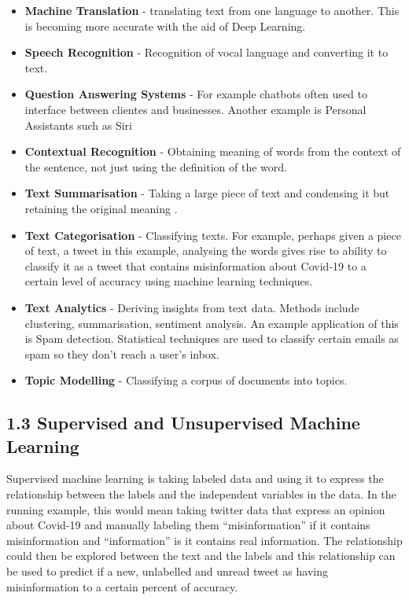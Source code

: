 \documentclass[
]{article}
\providecommand{\tightlist}{%
  \setlength{\itemsep}{0pt}\setlength{\parskip}{0pt}}
\begin{document}
\begin{itemize}
\tightlist
\item
  \textbf{Machine Translation} - translating text from one language to
  another. This is becoming more accurate with the aid of Deep Learning.
\item
  \textbf{Speech Recognition} - Recognition of vocal language and
  converting it to text.
\item
  \textbf{Question Answering Systems} - For example chatbots often used
  to interface between clientes and businesses. Another example is
  Personal Assistants such as Siri
\item
  \textbf{Contextual Recognition} - Obtaining meaning of words from the
  context of the sentence, not just using the definition of the word.
\item
  \textbf{Text Summarisation} - Taking a large piece of text and
  condensing it but retaining the original meaning .
\item
  \textbf{Text Categorisation} - Classifying texts. For example, perhaps
  given a piece of text, a tweet in this example, analysing the words
  gives rise to ability to classify it as a tweet that contains
  misinformation about Covid-19 to a certain level of accuracy using
  machine learning techniques.
\item
  \textbf{Text Analytics} - Deriving insights from text data. Methods
  include clustering, summarisation, sentiment analysis. An example
  application of this is Spam detection. Statistical techniques are used
  to classify certain emails as spam so they don't reach a user's inbox.
\item
  \textbf{Topic Modelling} - Classifying a corpus of documents into
  topics.
\end{itemize}

\hypertarget{supervised-and-unsupervised-machine-learning}{%
\subsection{1.3 Supervised and Unsupervised Machine
Learning}\label{supervised-and-unsupervised-machine-learning}}

Supervised machine learning is taking labeled data and using it to
express the relationship between the labels and the independent
variables in the data. In the running example, this would mean taking
twitter data that express an opinion about Covid-19 and manually
labeling them ``misinformation'' if it contains misinformation and
``information'' is it contains real information. The relationship could
then be explored between the text and the labels and this relationship
can be used to predict if a new, unlabelled and unread tweet as having
misinformation to a certain percent of accuracy.
\end{document}
